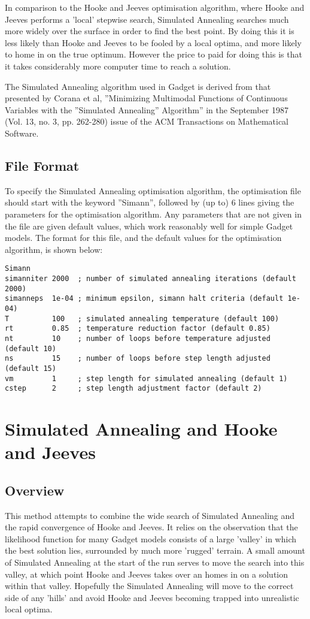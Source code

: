 \documentclass [a4paper, 10pt]{book}
\begin{document}
\bigskip
In comparison to the Hooke and Jeeves optimisation algorithm, where Hooke and Jeeves performs a 'local' stepwise search, Simulated Annealing searches much more widely over the surface in order to find the best point.  By doing this it is less likely than Hooke and Jeeves to be fooled by a local optima, and more likely to home in on the true optimum.  However the price to paid for doing this is that it takes considerably more computer time to reach a solution.

\bigskip
The Simulated Annealing algorithm used in Gadget is derived from that presented by Corana et al, ''Minimizing Multimodal Functions of Continuous Variables with the ''Simulated Annealing'' Algorithm'' in the September 1987 (Vol. 13, no. 3, pp. 262-280) issue of the ACM Transactions on Mathematical Software.

\subsection{File Format}
To specify the Simulated Annealing optimisation algorithm, the optimisation file should start with the keyword ''Simann'', followed by (up to) 6 lines giving the parameters for the optimisation algorithm.  Any parameters that are not given in the file are given default values, which work reasonably well for simple Gadget models.  The format for this file, and the default values for the optimisation algorithm, is shown below:

\begin{verbatim}
Simann
simanniter 2000  ; number of simulated annealing iterations (default 2000)
simanneps  1e-04 ; minimum epsilon, simann halt criteria (default 1e-04)
T          100   ; simulated annealing temperature (default 100)
rt         0.85  ; temperature reduction factor (default 0.85)
nt         10    ; number of loops before temperature adjusted (default 10)
ns         15    ; number of loops before step length adjusted (default 15)
vm         1     ; step length for simulated annealing (default 1)
cstep      2     ; step length adjustment factor (default 2)
\end{verbatim}

\section{Simulated Annealing and Hooke and Jeeves}\label{sec:simannandhooke}
\subsection{Overview}
This method attempts to combine the wide search of Simulated Annealing and the rapid convergence of Hooke and Jeeves.  It relies on the observation that the likelihood function for many Gadget models consists of a large 'valley' in which the best solution lies, surrounded by much more 'rugged' terrain.  A small amount of Simulated Annealing at the start of the run serves to move the search into this valley, at which point Hooke and Jeeves takes over an homes in on a solution within that valley.  Hopefully the Simulated Annealing will move to the correct side of any 'hills' and avoid Hooke and Jeeves becoming trapped into unrealistic local optima.
\end{document}

